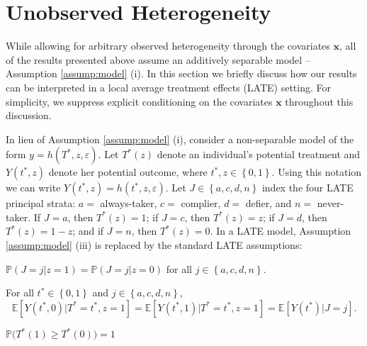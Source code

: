 \section{Unobserved Heterogeneity}
\label{sec:het}
While allowing for arbitrary observed heterogeneity through the covariates $\mathbf{x}$, all of the results presented above assume an additively separable model -- Assumption \ref{assump:model} (i).
In this section we briefly discuss how our results can be interpreted in a local average treatment effects (LATE) setting.
For simplicity, we suppress explicit conditioning on the covariates $\mathbf{x}$ throughout this discussion.

In lieu of Assumption \ref{assump:model} (i), consider a non-separable model of the form $y = h(T^*,z,\varepsilon)$.
Let $T^*(z)$ denote an individual's potential treatment and $Y(t^*,z)$ denote her potential outcome, where $t^*,z\in \left\{ 0,1 \right\}$.
Using this notation we can write $Y(t^*,z) = h(t^*,z,\varepsilon)$.
Let $J \in \left\{ a, c, d, n \right\}$ index the four LATE principal strata: $a = $ always-taker, $c = $ complier, $d = $ defier, and $n =$ never-taker.
If $J=a$, then $T^*(z) = 1$; if $J=c$, then $T^*(z) = z$; if $J=d$, then $T^*(z) = 1 - z$; and if $J=n$, then $T^*(z)=0$.
In a LATE model, Assumption \ref{assump:model} (iii) is replaced by the standard LATE assumptions:
\begin{assump}
    $\mathbb{P}(J=j|z=1) = \mathbb{P}(J=j|z=0)$ 
  for all  $j\in \left\{ a, c, d, n \right\}$.
\end{assump}
\begin{assump}
    For all $t^* \in \left\{ 0,1 \right\}$ and $j\in \left\{ a, c, d, n \right\}$,
    \[\mathbb{E}\left[Y(t^*,0)|T^*=t^*,z=1\right]=\mathbb{E}\left[Y(t^*,1)|T^*=t^*,z=1\right] = \mathbb{E}[Y(t^*)|J=j].\]
\end{assump}
\begin{assump}[Monotonicity]
    $\mathbb{P}\big(T^*(1) \geq T^*(0)\big) = 1$ 
\end{assump}

